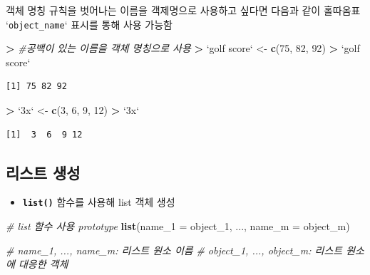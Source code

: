 \documentclass[
  11pt,
]{krantz}
\newenvironment{Shaded}{\begin{snugshade}}{\end{snugshade}}
\newcommand{\CommentTok}[1]{\textcolor[rgb]{0.37,0.37,0.37}{\textit{#1}}}
\newcommand{\DataTypeTok}[1]{\textcolor[rgb]{0.27,0.27,0.27}{#1}}
\newcommand{\DecValTok}[1]{\textcolor[rgb]{0.06,0.06,0.06}{#1}}
\newcommand{\ErrorTok}[1]{\textcolor[rgb]{0.14,0.14,0.14}{\textbf{#1}}}
\newcommand{\KeywordTok}[1]{\textcolor[rgb]{0.27,0.27,0.27}{\textbf{#1}}}
\newcommand{\NormalTok}[1]{#1}
\newcommand{\OperatorTok}[1]{\textcolor[rgb]{0.43,0.43,0.43}{\textbf{#1}}}
\newcommand{\StringTok}[1]{\textcolor[rgb]{0.5,0.5,0.5}{#1}}
\providecommand{\tightlist}{%
  \setlength{\itemsep}{0pt}\setlength{\parskip}{0pt}}
\let\BeginKnitrBlock\begin \let\EndKnitrBlock\end
\begin{document}
\normalsize

\footnotesize

\BeginKnitrBlock{rmdtip}
객체 명칭 규칙을 벗어나는 이름을 객제명으로 사용하고 싶다면 다음과 같이 홀따옴표 `\texttt{object\_name}` 표시를 통해 사용 가능함
\EndKnitrBlock{rmdtip}

\normalsize

\footnotesize

\begin{Shaded}
\begin{Highlighting}[]
\OperatorTok{>}\StringTok{ }\CommentTok{#공백이 있는 이름을 객체 명칭으로 사용}
\ErrorTok{>}\StringTok{ `}\DataTypeTok{golf score}\StringTok{`}\NormalTok{ <-}\StringTok{ }\KeywordTok{c}\NormalTok{(}\DecValTok{75}\NormalTok{, }\DecValTok{82}\NormalTok{, }\DecValTok{92}\NormalTok{)}
\OperatorTok{>}\StringTok{ `}\DataTypeTok{golf score}\StringTok{`}
\end{Highlighting}
\end{Shaded}

\begin{verbatim}
[1] 75 82 92
\end{verbatim}

\begin{Shaded}
\begin{Highlighting}[]
\OperatorTok{>}\StringTok{ `}\DataTypeTok{3x}\StringTok{`}\NormalTok{ <-}\StringTok{ }\KeywordTok{c}\NormalTok{(}\DecValTok{3}\NormalTok{, }\DecValTok{6}\NormalTok{, }\DecValTok{9}\NormalTok{, }\DecValTok{12}\NormalTok{)}
\OperatorTok{>}\StringTok{ `}\DataTypeTok{3x}\StringTok{`}
\end{Highlighting}
\end{Shaded}

\begin{verbatim}
[1]  3  6  9 12
\end{verbatim}

\normalsize

\hypertarget{make-list}{%
\subsection{리스트 생성}\label{make-list}}

\begin{itemize}
\tightlist
\item
  \textbf{\texttt{list()}} 함수를 사용해 list 객체 생성
\end{itemize}

\footnotesize

\begin{Shaded}
\begin{Highlighting}[]
\CommentTok{# list 함수 사용 prototype}
\KeywordTok{list}\NormalTok{(}\DataTypeTok{name_1 =}\NormalTok{ object_}\DecValTok{1}\NormalTok{, ..., }\DataTypeTok{name_m =}\NormalTok{ object_m)}

\CommentTok{# name_1, ..., name_m: 리스트 원소 이름}
\CommentTok{# object_1, ..., object_m: 리스트 원소에 대응한 객체}
\end{Highlighting}
\end{Shaded}
\end{document}

